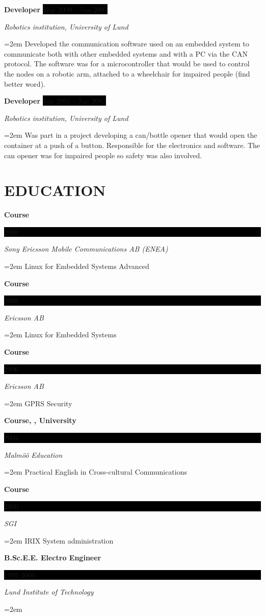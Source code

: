 \documentclass[paper=a4,fontsize=11pt]{scrartcl}
\newcommand{\sepspace}{\vspace*{1em}}
\newcommand{\NewPart}[1]{\section*{\uppercase{#1}}}
\newcommand{\EducationEntry}[4]{
		\noindent \textbf{#1} \hfill 					%
		\colorbox{Black}{%
			\parbox{6em}{%
			\hfill\color{White}#2}} \par				%
		\noindent \textit{#3} \par					%
		\noindent\hangindent=2em\hangafter=0 \small #4 	%
		\normalsize \par}
\newcommand{\WorkEntry}[4]{						%
		\noindent \textbf{#1} \hfill 					%
		\colorbox{Black}{\color{White}#2} \par		%
		\noindent \textit{#3} \par					%
		\noindent\hangindent=2em\hangafter=0 \small #4 	%
		\normalsize \par}
\begin{document}
\WorkEntry{Developer}{Mar 2000 - Jun 2003}{Robotics institution, University of Lund}		
{Developed the communication software used on an embedded system to communicate both with other  embedded systems and with a PC via the CAN protocol.
  The software was for a microcontroller that would be used to control the nodes on a robotic arm, attached to a wheelchair for
impaired people (find better word).} %
\sepspace

\WorkEntry{Developer}{Jan 2001 - Jun 2002}{Robotics institution, University of Lund}		
{Was part in a project developing a can/bottle opener that would open the container at a push of a button. Responsible for the electronics and software. 
The can opener was for impaired people so safety was also involved.} %


\NewPart{Education}{}

\EducationEntry {Course}{2009}{Sony Ericsson Mobile Communications AB (ENEA)}
{Linux for Embedded Systems Advanced}	
\sepspace

\EducationEntry {Course}{2008}{Ericsson AB}
{Linux for Embedded Systems}	
\sepspace

\EducationEntry {Course}{2006}{Ericsson AB}
{GPRS Security}	
\sepspace

\EducationEntry{Course, , University}{2003}{Malm\"{o}ö Education}
{Practical English in Cross-cultural Communications}
\sepspace

\EducationEntry {Course}{2000}{SGI}
{IRIX System administration}	
\sepspace

\EducationEntry{B.Sc.E.E. Electro Engineer}{1997-2000}{Lund Institute of Technology} {}
\end{document}
